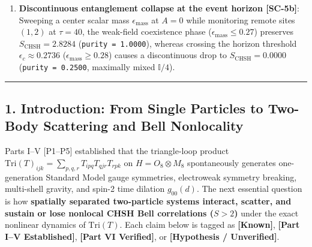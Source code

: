 \documentclass[
  a4paper,
]{article}
\begin{document}
\begin{enumerate}
  separated site pair \((1,2), (0,1), (1,4)\) of the vacuum \(H\)
  spontaneously saturates the Tsirelson bound with purity
  \texttt{1.0000}, \(S_E = 1.0000\text{ bit}\), and
  \textbf{\(S_{\mathrm{CHSH}} = \mathbf{2.828358} \approx 2\sqrt{2}\)}
  (verified identically by both the Horodecki optimum and direct
  evaluation on four explicit unit measurement vectors). Even when
  degraded by injecting a product state \(|\uparrow_1\uparrow_2\rangle\)
  (\(S_{\mathrm{CHSH}}(0) = 2.1462, S_E = 0.291\text{ bit}\)),
  \(\mathrm{Tri}(T)\) dynamically restores entanglement to
  \textbf{\(S_{\mathrm{CHSH}} = 2.6973 \to 2.8259 \to 2.8117\)}
  (\(S_E = 0.983\text{ bit}\)) across \(\tau = 1 \to 3 \to 40\).
\item
  \textbf{Discontinuous entanglement collapse at the event horizon
  {[}SC-5b{]}}: Sweeping a center scalar mass
  \(\epsilon_{\mathrm{mass}}\) at \(A=0\) while monitoring remote sites
  \((1,2)\) at \(\tau=40\), the weak-field coexistence phase
  (\(\epsilon_{\mathrm{mass}} \le 0.27\)) preserves
  \textbf{\(S_{\mathrm{CHSH}} = \mathbf{2.8284}\)}
  (\texttt{purity\ =\ 1.0000}), whereas crossing the horizon threshold
  \(\epsilon_c \approx 0.2736\) (\(\epsilon_{\mathrm{mass}} \ge 0.28\))
  causes a discontinuous drop to
  \textbf{\(S_{\mathrm{CHSH}} = \mathbf{0.0000}\)}
  (\texttt{purity\ =\ 0.2500}, maximally mixed \(\mathbb{I}/4\)).
\end{enumerate}

\begin{center}\rule{0.5\linewidth}{0.5pt}\end{center}

\subsection{1. Introduction: From Single Particles to Two-Body
Scattering and Bell
Nonlocality}\label{introduction-from-single-particles-to-two-body-scattering-and-bell-nonlocality}

Parts I--V {[}P1--P5{]} established that the triangle-loop product
\(\mathrm{Tri}(T)_{ijk} = \sum_{p,q,r} T_{ipq} T_{qjr} T_{rpk}\) on
\(H = O_8 \otimes M_8\) spontaneously generates one-generation Standard
Model gauge symmetries, electroweak symmetry breaking, multi-shell
gravity, and spin-2 time dilation \(g_{00}(d)\). The next essential
question is how \textbf{spatially separated two-particle systems
interact, scatter, and sustain or lose nonlocal CHSH Bell correlations
(\(S > 2\))} under the exact nonlinear dynamics of \(\mathrm{Tri}(T)\).
Each claim below is tagged as \textbf{{[}Known{]}}, \textbf{{[}Part I--V
Established{]}}, \textbf{{[}Part VI Verified{]}}, or
\textbf{{[}Hypothesis / Unverified{]}}.
\end{document}

